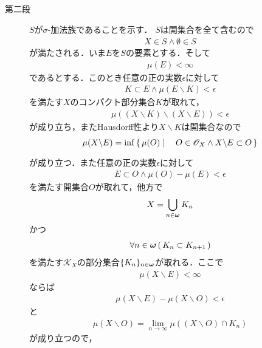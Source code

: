 \begin{sketch}
\begin{description}
				\item[第二段] $S$が$\sigma$-加法族であることを示す．
					$S$は開集合を全て含むので
					\begin{align}
						X \in S \wedge \emptyset \in S
					\end{align}
					が満たされる．いま$E$を$S$の要素とする．そして
					\begin{align}
						\mu(E) < \infty
					\end{align}
					であるとする．このとき任意の正の実数$\epsilon$に対して
					\begin{align}
						K \subset E \wedge \mu(E \backslash K) < \epsilon
					\end{align}
					を満たす$X$のコンパクト部分集合$K$が取れて，
					\begin{align}
						\mu((X \backslash K) \backslash (X \backslash E)) < \epsilon
					\end{align}
					が成り立ち，またHausdorff性より$X \backslash K$は開集合なので
					\begin{align}
						\mu(X \backslash E) = \operatorname*{inf}_{} \left\{\, \mu(O) \mid \quad O \in \mathscr{O}_X \wedge X \backslash E \subset O\, \right\}
					\end{align}
					が成り立つ．また任意の正の実数$\epsilon$に対して
					\begin{align}
						E \subset O \wedge \mu(O) - \mu(E) < \epsilon
					\end{align}
					を満たす開集合$O$が取れて，他方で
					\begin{align}
						X = \bigcup_{n \in {\boldsymbol \omega}} K_n
						\label{thm_regularity_theorem_for_positive_Borel_measures_1}
					\end{align}
					かつ
					\begin{align}
						\forall n \in {\boldsymbol \omega}\, (\, K_n \subset K_{n+1}\, )
						\label{thm_regularity_theorem_for_positive_Borel_measures_2}
					\end{align}
					を満たす$\mathscr{K}_X$の部分集合$\{K_n\}_{n \in {\boldsymbol \omega}}$が取れる．ここで
					\begin{align}
						\mu(X \backslash E) < \infty
					\end{align}
					ならば
					\begin{align}
						\mu(X \backslash E) - \mu(X \backslash O) < \epsilon
					\end{align}
					と
					\begin{align}
						\mu(X \backslash O) = \lim_{n \to \infty} \mu((X \backslash O) \cap K_n)
					\end{align}
					が成り立つので，

\end{description}
\end{sketch}
